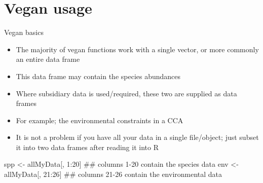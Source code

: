 \documentclass[10pt,ignorenonframetext,compress, aspectratio=169]{beamer}
\newenvironment{Shaded}{\begin{snugshade}}{\end{snugshade}}
\newcommand{\DecValTok}[1]{\textcolor[rgb]{0.00,0.00,0.81}{{#1}}}
\newcommand{\StringTok}[1]{\textcolor[rgb]{0.31,0.60,0.02}{{#1}}}
\newcommand{\NormalTok}[1]{{#1}}
\providecommand{\tightlist}{%
  \setlength{\itemsep}{0pt}\setlength{\parskip}{0pt}}
\begin{document}
\section{Vegan usage}\label{vegan-usage}

\begin{frame}[fragile]{Vegan basics}

\begin{itemize}
\tightlist
\item
  The majority of vegan functions work with a single vector, or more
  commonly an entire data frame
\item
  This data frame may contain the species abundances
\item
  Where subsidiary data is used/required, these two are supplied as data
  frames
\item
  For example; the environmental constraints in a CCA
\item
  It is not a problem if you have all your data in a single file/object;
  just subset it into two data frames after reading it into R
\end{itemize}

\begin{Shaded}
\begin{Highlighting}[]
\NormalTok{spp <-}\StringTok{ }\NormalTok{allMyData[, }\DecValTok{1}\NormalTok{:}\DecValTok{20}\NormalTok{] ## columns 1-20 contain the species data}
\NormalTok{env <-}\StringTok{ }\NormalTok{allMyData[, }\DecValTok{21}\NormalTok{:}\DecValTok{26}\NormalTok{] ## columns 21-26 contain the environmental data}
\end{Highlighting}
\end{Shaded}

\end{frame}
\end{document}
